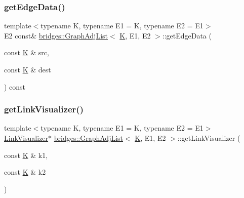 \subsubsection{\texorpdfstring{getEdgeData()}{getEdgeData()}\hspace{0.1cm}{\footnotesize\ttfamily [2/2]}}
{\footnotesize\ttfamily template$<$typename K, typename E1 = K, typename E2 = E1$>$ \\
E2 const\& \mbox{\hyperlink{classbridges_1_1_graph_adj_list}{bridges\+::\+Graph\+Adj\+List}}$<$ \mbox{\hyperlink{namespacebridges_acfb0a4f7877d8f63de3e6862004c50edaa5f3c6a11b03839d46af9fb43c97c188}{K}}, E1, E2 $>$\+::get\+Edge\+Data (\begin{DoxyParamCaption}\item[{const \mbox{\hyperlink{namespacebridges_acfb0a4f7877d8f63de3e6862004c50edaa5f3c6a11b03839d46af9fb43c97c188}{K}} \&}]{src,  }\item[{const \mbox{\hyperlink{namespacebridges_acfb0a4f7877d8f63de3e6862004c50edaa5f3c6a11b03839d46af9fb43c97c188}{K}} \&}]{dest }\end{DoxyParamCaption}) const\hspace{0.3cm}{\ttfamily [inline]}}

\mbox{\label{classbridges_1_1_graph_adj_list_a6e065b1411388387ff1e4df9227ce480}} 
\subsubsection{\texorpdfstring{getLinkVisualizer()}{getLinkVisualizer()}}
{\footnotesize\ttfamily template$<$typename K, typename E1 = K, typename E2 = E1$>$ \\
\mbox{\hyperlink{classbridges_1_1_link_visualizer}{Link\+Visualizer}}$\ast$ \mbox{\hyperlink{classbridges_1_1_graph_adj_list}{bridges\+::\+Graph\+Adj\+List}}$<$ \mbox{\hyperlink{namespacebridges_acfb0a4f7877d8f63de3e6862004c50edaa5f3c6a11b03839d46af9fb43c97c188}{K}}, E1, E2 $>$\+::get\+Link\+Visualizer (\begin{DoxyParamCaption}\item[{const \mbox{\hyperlink{namespacebridges_acfb0a4f7877d8f63de3e6862004c50edaa5f3c6a11b03839d46af9fb43c97c188}{K}} \&}]{k1,  }\item[{const \mbox{\hyperlink{namespacebridges_acfb0a4f7877d8f63de3e6862004c50edaa5f3c6a11b03839d46af9fb43c97c188}{K}} \&}]{k2 }\end{DoxyParamCaption})\hspace{0.3cm}{\ttfamily [inline]}}

